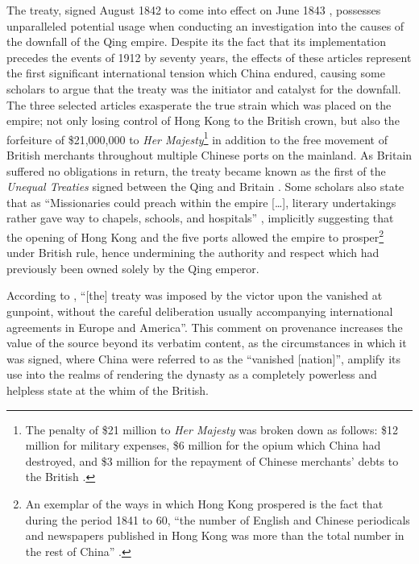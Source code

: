 \documentclass[a4paper,oneside]{article}
\begin{document}
The treaty, signed  August 1842 to come into effect on  June
1843 \autocite{Saw:1975}, possesses unparalleled potential usage when conducting
an investigation into the causes of the downfall of the Qing empire. Despite its
the fact that its implementation precedes the events of 1912 by seventy years,
the effects of these articles represent the first significant international
tension which China endured, causing some scholars to argue that the treaty was
the initiator and catalyst for the downfall. The three selected articles
exasperate the true strain which was placed on the empire; not only losing
control of Hong Kong to the British crown, but also the forfeiture of
\$21,000,000 to \textit{Her Majesty}\footnote{The penalty of \$21 million to
\textit{Her Majesty} was broken down as follows: \$12 million for military
expenses, \$6 million for the opium which China had destroyed, and \$3 million
for the repayment of Chinese merchants' debts to the British
\autocite{Hsu:1999}.} in addition to the free movement of British merchants
throughout multiple Chinese ports on the mainland. As Britain suffered no
obligations in return, the treaty became known as the first of the
\textit{Unequal Treaties} signed between the Qing and Britain
\autocite{Hoe:1999}. Some scholars also state that as ``Missionaries could
preach within the empire [\ldots], literary undertakings rather gave way to
chapels, schools, and hospitals'' \autocite{Britton:1933}, implicitly suggesting
that the opening of Hong Kong and the five ports allowed the empire to
prosper\footnote{An exemplar of the ways in which Hong Kong prospered is the
fact that during the period 1841 to 60, ``the number of English and Chinese
periodicals and newspapers published in Hong Kong was more than the total number
in the rest of China'' \autocite{Huang:2001}.} under British rule, hence
undermining the authority and respect which had previously been owned solely by
the Qing emperor.

According to \autocite{Hsu:1999}, ``[the] treaty was imposed by the victor upon
the vanished at gunpoint, without the careful deliberation usually accompanying
international agreements in Europe and America''.  This comment on provenance
increases the value of the source beyond its verbatim content, as the
circumstances in which it was signed, where China were referred to as the
``vanished [nation]'', amplify its use into the realms of rendering the dynasty
as a completely powerless and helpless state at the whim of the British.
\end{document}
